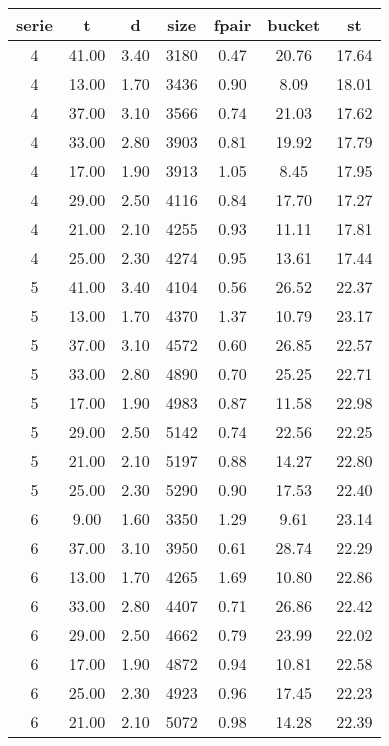 \begin{tabular}{|c|c|c|c|c|c|c|}
\hline
\textbf{serie} & \textbf{t} & \textbf{d} & \textbf{size} & \textbf{fpair} & \textbf{bucket} & \textbf{st}\\
\hline
4 & 41.00 & 3.40 & 3180 & 0.47 & 20.76 & 17.64\\
\hline
4 & 13.00 & 1.70 & 3436 & 0.90 & 8.09 & 18.01\\
\hline
4 & 37.00 & 3.10 & 3566 & 0.74 & 21.03 & 17.62\\
\hline
4 & 33.00 & 2.80 & 3903 & 0.81 & 19.92 & 17.79\\
\hline
4 & 17.00 & 1.90 & 3913 & 1.05 & 8.45 & 17.95\\
\hline
4 & 29.00 & 2.50 & 4116 & 0.84 & 17.70 & 17.27\\
\hline
4 & 21.00 & 2.10 & 4255 & 0.93 & 11.11 & 17.81\\
\hline
4 & 25.00 & 2.30 & 4274 & 0.95 & 13.61 & 17.44\\
\hline
5 & 41.00 & 3.40 & 4104 & 0.56 & 26.52 & 22.37\\
\hline
5 & 13.00 & 1.70 & 4370 & 1.37 & 10.79 & 23.17\\
\hline
5 & 37.00 & 3.10 & 4572 & 0.60 & 26.85 & 22.57\\
\hline
5 & 33.00 & 2.80 & 4890 & 0.70 & 25.25 & 22.71\\
\hline
5 & 17.00 & 1.90 & 4983 & 0.87 & 11.58 & 22.98\\
\hline
5 & 29.00 & 2.50 & 5142 & 0.74 & 22.56 & 22.25\\
\hline
5 & 21.00 & 2.10 & 5197 & 0.88 & 14.27 & 22.80\\
\hline
5 & 25.00 & 2.30 & 5290 & 0.90 & 17.53 & 22.40\\
\hline
6 & 9.00 & 1.60 & 3350 & 1.29 & 9.61 & 23.14\\
\hline
6 & 37.00 & 3.10 & 3950 & 0.61 & 28.74 & 22.29\\
\hline
6 & 13.00 & 1.70 & 4265 & 1.69 & 10.80 & 22.86\\
\hline
6 & 33.00 & 2.80 & 4407 & 0.71 & 26.86 & 22.42\\
\hline
6 & 29.00 & 2.50 & 4662 & 0.79 & 23.99 & 22.02\\
\hline
6 & 17.00 & 1.90 & 4872 & 0.94 & 10.81 & 22.58\\
\hline
6 & 25.00 & 2.30 & 4923 & 0.96 & 17.45 & 22.23\\
\hline
6 & 21.00 & 2.10 & 5072 & 0.98 & 14.28 & 22.39\\
\hline
\end{tabular}

